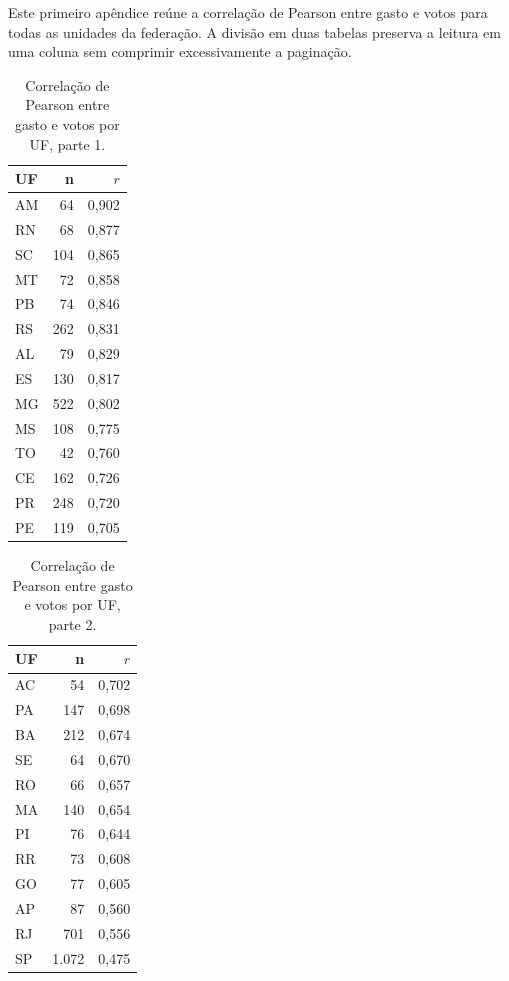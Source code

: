 \documentclass[conference]{IEEEtran}
\begin{document}
Este primeiro apêndice reúne a correlação de Pearson entre gasto e votos
para todas as unidades da federação. A divisão em duas tabelas preserva a
leitura em uma coluna sem comprimir excessivamente a paginação.

\begin{table}[H]
  \centering
  \caption{Correlação de Pearson entre gasto e votos por UF, parte 1.}
  \label{tab:pearson_estados_a}
  \footnotesize
  \begin{tabular}{lrr}
    \toprule
    \textbf{UF} & \textbf{n} & \textbf{$r$} \\
    \midrule
    AM & 64 & 0,902 \\
    RN & 68 & 0,877 \\
    SC & 104 & 0,865 \\
    MT & 72 & 0,858 \\
    PB & 74 & 0,846 \\
    RS & 262 & 0,831 \\
    AL & 79 & 0,829 \\
    ES & 130 & 0,817 \\
    MG & 522 & 0,802 \\
    MS & 108 & 0,775 \\
    TO & 42 & 0,760 \\
    CE & 162 & 0,726 \\
    PR & 248 & 0,720 \\
    PE & 119 & 0,705 \\
    \bottomrule
  \end{tabular}
\end{table}

\begin{table}[H]
  \centering
  \caption{Correlação de Pearson entre gasto e votos por UF, parte 2.}
  \label{tab:pearson_estados_b}
  \footnotesize
  \begin{tabular}{lrr}
    \toprule
    \textbf{UF} & \textbf{n} & \textbf{$r$} \\
    \midrule
    AC & 54 & 0,702 \\
    PA & 147 & 0,698 \\
    BA & 212 & 0,674 \\
    SE & 64 & 0,670 \\
    RO & 66 & 0,657 \\
    MA & 140 & 0,654 \\
    PI & 76 & 0,644 \\
    RR & 73 & 0,608 \\
    GO & 77 & 0,605 \\
    AP & 87 & 0,560 \\
    RJ & 701 & 0,556 \\
    SP & 1.072 & 0,475 \\
    \bottomrule
  \end{tabular}
\end{table}
\end{document}
